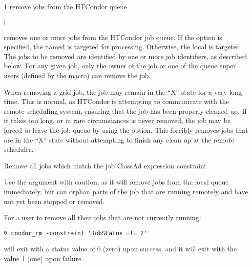 \begin{ManPage}{\label{man-condor-rm}}{1}
{remove jobs from the HTCondor queue}
\Synopsis {}
\ToolArgsBase

\ToolDebugOption
{}
\ToolLocate
\ToolJobs
$|$  \Dots

\ToolDebugOption
\ToolLocate
\ToolAll


\Description

 removes one or more jobs from the HTCondor job queue.  
If the  option is specified, the named  is targeted
for processing.  
Otherwise, the local  is targeted.
The jobs to be removed are identified by one or more job identifiers, as
described below.
For any given job, only the owner of the job or one of the queue super users
(defined by the  macro) can remove the job.

When removing a grid job, the job may remain in
the ``X'' state for a very long time. 
This is normal, as HTCondor is attempting to communicate with the
remote scheduling system, 
ensuring that the job has been properly cleaned up.
If it takes too long, or in rare circumstances is never removed,
the job may be forced to
leave the job queue by using the  option.
This forcibly removes jobs that are in the ``X'' state without attempting
to finish any clean up at the remote scheduler.

\begin{Options}
	\ToolArgsBaseDesc
	\ToolLocateDesc
        \ToolDebugDesc
	 {Remove all jobs which match
	                the job ClassAd expression constraint}
\end{Options}

\GenRem

Use the  argument with caution, as it will remove jobs
from the local queue immediately, but can orphan parts of the job
that are running remotely and have not yet been stopped or removed.

\Examples
For a user to remove all their jobs that are not currently running:
\footnotesize
\begin{verbatim}
% condor_rm -constraint 'JobStatus =!= 2'
\end{verbatim}
\normalsize

\ExitStatus

 will exit with a status value of 0 (zero) upon success,
and it will exit with the value 1 (one) upon failure.

\end{ManPage}
